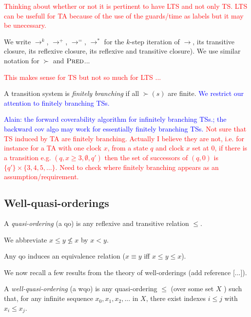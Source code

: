 \textcolor{red}{Thinking about whether or not it is pertinent to have LTS and not only TS. LTS can be usefull for TA because of the use of the guards/time as labels but it may be unecessary.}

We write $\rightarrow^{k}$, $\rightarrow^{+}$, $\rightarrow^{=}$, $\rightarrow^{*}$
for the $k$-step iteration of $\rightarrow$, its transitive closure, its reflexive closure, its reflexive and transitive closure). We use similar notation for $\succ$ and $\textsc{Pred}$...

\textcolor{red}{This makes sense for TS but not so much for LTS ...}

A transition system is {\em finitely branching} if all $\succ(s)$ are finite. 
\textcolor{blue}{We restrict our attention to finitely branching TSs.}

\textcolor{blue}{Alain: the forward coverability algorithm for infinitely branching TSs.; the backward cov algo may work for essentially finitely branching TSs.}
\textcolor{red}{Not sure that TS induced by TA are finitely branching. Actually I believe they are not, i.e. for instance for a TA with one clock $x$, from a state $q$ and clock $x$ set at $0$, if there is a transition e.g. $(q, x \geq 3, \emptyset, q')$ then the set of successors of 
$(q,0)$ is $\{q'\} \times \{3, 4, 5, \ldots \}$. Need to check where finitely branching appears as an assumption/requirement.}


\subsection{Well-quasi-orderings}

A {\em quasi-ordering} (a qo) is any reflexive and transitive relation $\leq$.

We abbreviate $x \leq y \not\leq x$ by $x < y$.


Any qo induces an equivalence relation ($x \equiv y$ iff $x \leq y \leq x$).

We now recall a few results from the theory of well-orderings (add reference [...]).


\begin{definition}
 A {\em well-quasi-ordering} (a wqo) is any quasi-ordering $\leq$ (over some set $X$ ) such that, for any infinite sequence $x_0, x_1, x_2, ...$ in $X$, there exist indexes $i \leq j$ with
$x_i \leq  x_j$.
\end{definition}

